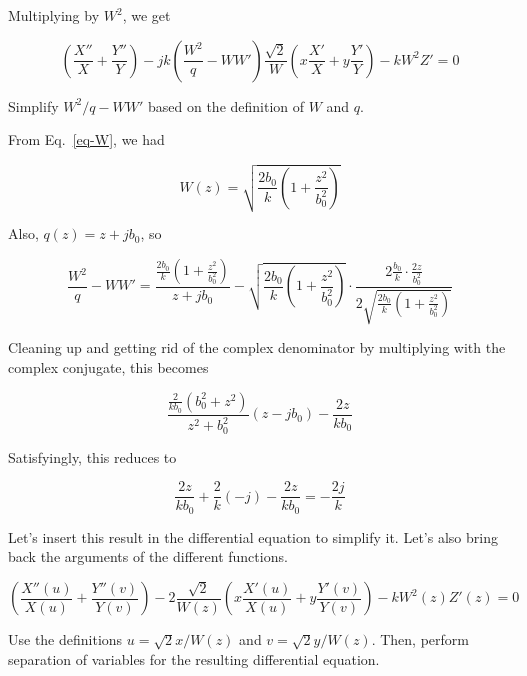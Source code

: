 Multiplying by $W^2$, we get

\begin{equation}
\left(\frac{X''}{X}+\frac{Y''}{Y}\right)  
- j k  \left(\frac{W^2}{q} - WW'\right)\frac{\sqrt{2}}{W}\left(x\frac{X'}{X}+y\frac{Y'}{Y}\right)
-kW^2Z' = 0
\end{equation} 

\begin{cue}
Simplify $W^2/q - WW'$ based on the definition of $W$ and $q$. 
\end{cue}

From Eq.~\ref{eq-W}, we had

\begin{equation}
W(z)=\sqrt{\frac{2 b_0}{k} \left(1 + \frac{z^2}{b_0^2}\right)} 
\end{equation}

Also, $q(z)=z+jb_0$, so

\begin{equation}
\frac{W^2}{q} - WW' = \frac{\frac{2 b_0}{k} \left(1 + \frac{z^2}{b_0^2}\right)}{z+jb_0} - \sqrt{\frac{2 b_0}{k} \left(1 + \frac{z^2}{b_0^2}\right)} \cdot \frac{2\frac{b_0}{k} \cdot \frac{2z}{b_0^2}}{2\sqrt{\frac{2 b_0}{k} \left(1 + \frac{z^2}{b_0^2}\right)} }
\end{equation}

Cleaning up and getting rid of the complex denominator by multiplying with the complex conjugate, this becomes

\begin{equation}
\frac{\frac{2}{k b_0} \left(b_0^2 + z^2\right)}{z^2+b_0^2}(z-jb_0) - \frac{2z}{k b_0}
\end{equation}

Satisfyingly, this reduces to

\begin{equation}
\frac{2z}{k b_0}  + \frac{2}{k}(-j) - \frac{2z}{k b_0} = - \frac{2j}{k}
\end{equation}

Let's insert this result in the differential equation to simplify it. Let's also bring back the arguments of the different functions.

\begin{equation}
  \left(\frac{X''(u)}{X(u)}+\frac{Y''(v)}{Y(v)}\right)  
  - 2  \frac{\sqrt{2}}{W(z)}\left(x\frac{X'(u)}{X(u)}+y\frac{Y'(v)}{Y(v)}\right)
  -kW^2(z)Z'(z) = 0
  \end{equation} 

\begin{cue}
Use the definitions $u = \sqrt{2} x / W(z)$ and  $v = \sqrt{2} y / W(z)$. Then, perform separation of variables for the resulting differential equation. 
\end{cue}

